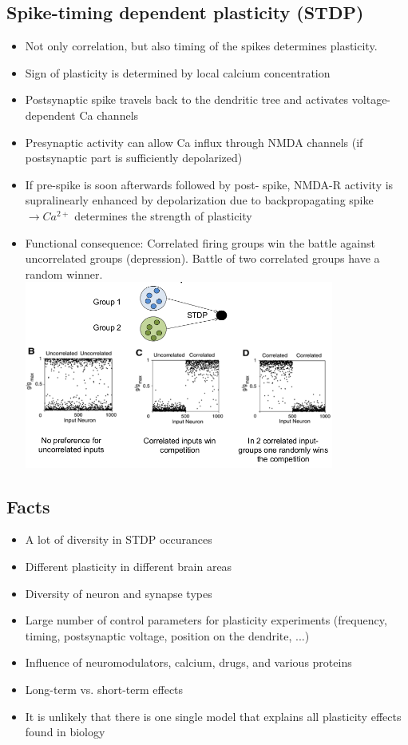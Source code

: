 \documentclass[english,11pt]{article}
\begin{document}
\subsection{Spike-timing dependent plasticity (STDP)}
\begin{itemize}
\item Not only correlation, but also timing of the spikes determines plasticity.
\item Sign of plasticity is determined by local calcium
concentration
\item Postsynaptic spike travels back to the dendritic tree and activates voltage-dependent Ca channels
\item Presynaptic activity can allow Ca influx through
NMDA channels (if postsynaptic part is sufficiently
depolarized)
\item If pre-spike is soon afterwards followed by post-
spike, NMDA-R activity is supralinearly enhanced by
depolarization due to backpropagating spike
$\rightarrow Ca^{2+}$ determines the strength of plasticity
\item Functional consequence:
\subitem Correlated firing groups win the battle against uncorrelated groups (depression). Battle of two correlated groups have a random winner.\\
\includegraphics[width=0.8\textwidth]{STDP-consequences.png}
\end{itemize}

\subsection{Facts}
\begin{itemize}
\item A lot of diversity in STDP occurances
\item Different plasticity in different brain areas
\item Diversity of neuron and synapse types
\item Large number of control parameters for plasticity experiments (frequency, timing, postsynaptic voltage, position on the dendrite, ...)
\item Influence of neuromodulators, calcium, drugs, and various proteins
\item Long-term vs. short-term effects
\item It is unlikely that there is one single model that explains all plasticity effects found in biology
\end{itemize}
\end{document}
